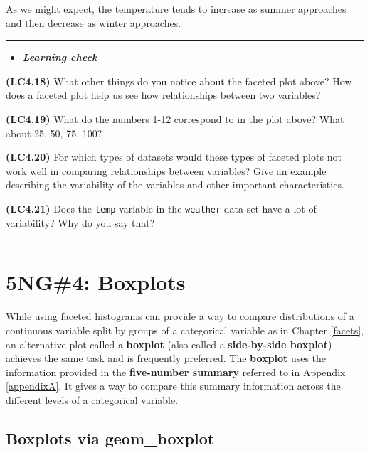 \documentclass[]{tufte-book}
\let\oldrule=\rule
\renewcommand{\rule}[1]{\oldrule{\linewidth}}
\newenvironment{rmdblock}[1]
  {\begin{shaded*}
  \begin{itemize}
  \renewcommand{\labelitemi}{
    \raisebox{-.7\height}[0pt][0pt]{
    }
  }
  \item
  }
  {
  \end{itemize}
  \end{shaded*}
  }
\newenvironment{learncheck}
  {\begin{rmdblock}{warning}}
  {\end{rmdblock}}
\begin{document}
As we might expect, the temperature tends to increase as summer
approaches and then decrease as winter approaches.

\begin{center}\rule{0.5\linewidth}{\linethickness}\end{center}

\begin{learncheck}
\textbf{\emph{Learning check}}
\end{learncheck}

\textbf{(LC4.18)} What other things do you notice about the faceted plot
above? How does a faceted plot help us see how relationships between two
variables?

\textbf{(LC4.19)} What do the numbers 1-12 correspond to in the plot
above? What about 25, 50, 75, 100?

\textbf{(LC4.20)} For which types of datasets would these types of
faceted plots not work well in comparing relationships between
variables? Give an example describing the variability of the variables
and other important characteristics.

\textbf{(LC4.21)} Does the \texttt{temp} variable in the
\texttt{weather} data set have a lot of variability? Why do you say
that?

\begin{center}\rule{0.5\linewidth}{\linethickness}\end{center}

\section{5NG\#4: Boxplots}\label{ng4-boxplots}

While using faceted histograms can provide a way to compare
distributions of a continuous variable split by groups of a categorical
variable as in Chapter \ref{facets}, an alternative plot called a
\textbf{boxplot} (also called a \textbf{side-by-side boxplot}) achieves
the same task and is frequently preferred. The \textbf{boxplot} uses the
information provided in the \textbf{five-number summary} referred to in
Appendix \ref{appendixA}. It gives a way to compare this summary
information across the different levels of a categorical variable.

\subsection{Boxplots via geom\_boxplot}\label{geomboxplot}
\end{document}
